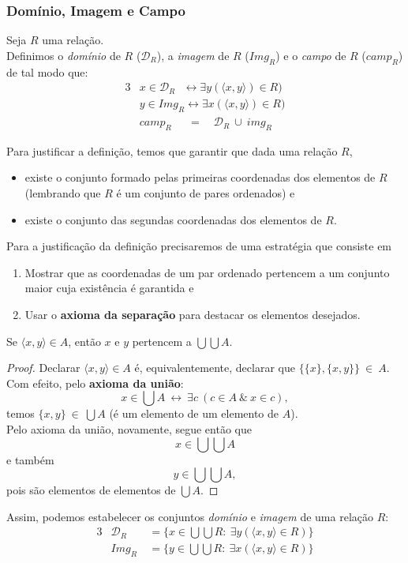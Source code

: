 \subsubsection{Domínio, Imagem e Campo}
\begin{definition}
  Seja $R$ uma relação.\\
  Definimos o \textit{domínio} de $R$ ($\mathcal{D}_{R}$), a \textit{imagem} de $R$ ($\mathit{Img}_{R}$) e o \textit{campo} de $R$ ($\mathit{camp}_{R}$) de tal modo que:
  \begin{alignat*}{3}
    & x \in \mathcal{D}_{R}\ \ \ \leftrightarrow \exists y (\langle x, y \rangle) \in R)\\
    & y \in \mathit{Img}_{R} \leftrightarrow \exists x (\langle x, y \rangle) \in R)\\
    & \mathit{camp}_{R}\quad \ \ =\quad \mathcal{D}_{R}\ \cup\ \mathit{img}_{R}
  \end{alignat*}
\end{definition}
Para justificar a definição, temos que garantir que dada uma relação $R$,
  \begin{itemize}
    \item existe o conjunto formado pelas primeiras coordenadas dos elementos de $R$ (lembrando que $R$ é um conjunto de pares ordenados) e
    \item existe o conjunto das segundas coordenadas dos elementos de $R.$
  \end{itemize}
Para a justificação da definição precisaremos de uma estratégia que consiste em
  \begin{enumerate}
    \item Mostrar que as coordenadas de um par ordenado pertencem a um conjunto maior cuja existência é garantida e
    \item Usar o \textbf{axioma da separação} para destacar os elementos desejados.
  \end{enumerate}
\begin{lemma}
  Se $\langle x, y \rangle \in A$, então $x$ e $y$ pertencem a $\bigcup \bigcup A.$
\end{lemma} 
\begin{proof}
  Declarar $\langle x, y \rangle \in A$ é, equivalentemente, declarar que $\{\{x\},\{x,y\}\}\ \in\ A$.\\
  Com efeito, pelo \textbf{axioma da união}:
  $$x \in \bigcup A\ \leftrightarrow\ \exists c\ (c \in A\ \&\ x \in c),$$
  temos $\{x,y\}\ \in\ \bigcup A$ (é um elemento de um elemento de $A$).\\
  Pelo axioma da união, novamente, segue então que $$x \in \bigcup \bigcup A$$
  e também
  $$y \in \bigcup \bigcup A,$$
  pois são elementos de elementos de $\bigcup A.$
\end{proof}
Assim, podemos estabelecer os conjuntos \textit{domínio} e \textit{imagem} de uma relação $R$:
\begin{alignat*}{3}
  & \mathcal{D}_{R}& \ = \{x \in \bigcup \bigcup R:\ \exists y (\langle x, y \rangle \in R) \}\\
  & \mathit{Img}_{R}& \ = \{y \in \bigcup \bigcup R:\ \exists x (\langle x, y \rangle \in R)\}
\end{alignat*}

